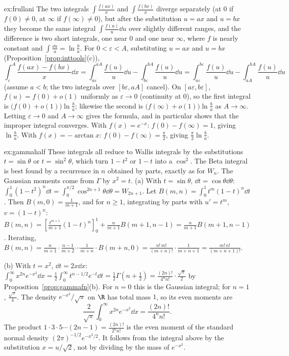 \begin{solution}{ex:frullani}
\idea The two integrals $\int\frac{f(ax)}x$ and $\int\frac{f(bx)}x$ diverge separately (at $0$ if $f(0)\ne0$, at $\infty$ if $f(\infty)\ne0$), but after the substitution $u=ax$ and $u=bx$ they become the same integral $\int\frac{f(u)}u\dd u$ over slightly different ranges, and the difference is two short integrals, one near $0$ and one near $\infty$, where $f$ is nearly constant and $\int\frac{\dd u}u=\ln\frac ba$.
\writeup For $0<\varepsilon<A$, substituting $u=ax$ and $u=bx$ (Proposition~\ref{prop:inttools}(c)),
\[
\int_\varepsilon^A\frac{f(ax)-f(bx)}x\dd x=\int_{a\varepsilon}^{aA}\frac{f(u)}u\dd u-\int_{b\varepsilon}^{bA}\frac{f(u)}u\dd u=\int_{a\varepsilon}^{b\varepsilon}\frac{f(u)}u\dd u-\int_{aA}^{bA}\frac{f(u)}u\dd u
\]
(assume $a<b$; the two integrals over $[b\varepsilon,aA]$ cancel). On $[a\varepsilon,b\varepsilon]$, $f(u)=f(0)+o(1)$ uniformly as $\varepsilon\to0$ (continuity at $0$), so the first integral is $\bigl(f(0)+o(1)\bigr)\ln\frac ba$; likewise the second is $\bigl(f(\infty)+o(1)\bigr)\ln\frac ba$ as $A\to\infty$. Letting $\varepsilon\to0$ and $A\to\infty$ gives the formula, and in particular shows that the improper integral converges.
With $f(x)=e^{-x}$: $f(0)-f(\infty)=1$, giving $\ln\frac ba$. With $f(x)=-\arctan x$: $f(0)-f(\infty)=\frac\pi2$, giving $\frac\pi2\ln\frac ba$.
\end{solution}

\begin{solution}{ex:gammahalf}
\idea These integrals all reduce to Wallis integrals by the substitutions $t=\sin\theta$ or $t=\sin^2\theta$, which turn $1-t^2$ or $1-t$ into a $\cos^2$. The Beta integral is best found by a recurrence in $n$ obtained by parts, exactly as for $W_n$. The Gaussian moments come from $\Gamma$ by $x^2=t$.
\writeup (a) With $t=\sin\theta$, $\dd t=\cos\theta\dd\theta$: $\int_0^1(1-t^2)^n\dd t=\int_0^{\pi/2}\cos^{2n+1}\theta\dd\theta=W_{2n+1}$.
Let $B(m,n)=\int_0^1t^m(1-t)^n\dd t$. Then $B(m,0)=\frac1{m+1}$, and for $n\ge1$, integrating by parts with $u'=t^m$, $v=(1-t)^n$: $B(m,n)=\left[\frac{t^{m+1}}{m+1}(1-t)^n\right]_0^1+\frac n{m+1}B(m+1,n-1)=\frac n{m+1}B(m+1,n-1)$. Iterating, $B(m,n)=\frac{n}{m+1}\cdot\frac{n-1}{m+2}\cdots\frac1{m+n}\cdot B(m+n,0)=\frac{n!\,m!}{(m+n)!}\cdot\frac1{m+n+1}=\frac{m!\,n!}{(m+n+1)!}$.

(b) With $t=x^2$, $\dd t=2x\dd x$: $\int_0^\infty x^{2n}e^{-x^2}\dd x=\frac12\int_0^\infty t^{n-1/2}e^{-t}\dd t=\frac12\Gamma\left(n+\frac12\right)=\frac{(2n)!}{4^nn!}\cdot\frac{\sqrt\pi}2$ by Proposition~\ref{prop:gammafn}(b). For $n=0$ this is the Gaussian integral; for $n=1$, $\frac{\sqrt\pi}4$. The density $e^{-x^2}/\sqrt\pi$ on $\R$ has total mass $1$, so its even moments are
\[
\frac{2}{\sqrt\pi}\int_0^\infty x^{2n}e^{-x^2}\dd x=\frac{(2n)!}{4^nn!}.
\]
The product $1\cdot3\cdot5\cdots(2n-1)=\frac{(2n)!}{2^nn!}$ is the even moment of the standard normal density $(2\pi)^{-1/2}e^{-x^2/2}$. It follows from the integral above by the substitution $x=u/\sqrt2$, not by dividing by the mass of $e^{-x^2}$.
\end{solution}

